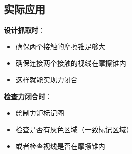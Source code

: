 \documentclass[12pt,a4paper]{article}
\begin{document}
\subsection{实际应用}

\textbf{设计抓取时}：
\begin{itemize}
\item 确保两个接触的摩擦锥足够大
\item 确保连接两个接触的视线在摩擦锥内
\item 这样就能实现力闭合
\end{itemize}

\textbf{检查力闭合时}：
\begin{itemize}
\item 绘制力矩标记图
\item 检查是否有灰色区域（一致标记区域）
\item 或者检查视线是否在摩擦锥内
\end{itemize}
\end{document}
